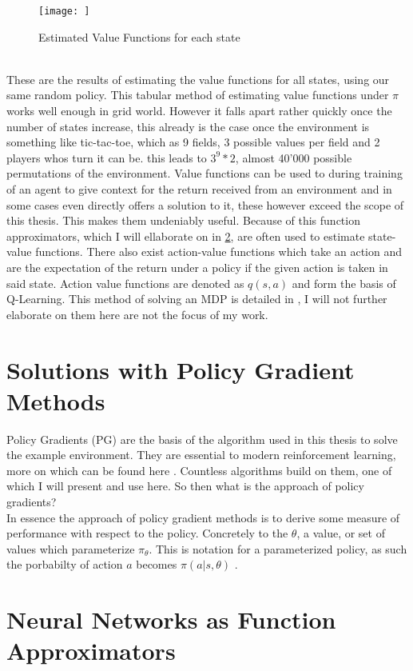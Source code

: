 \begin{figure}[h!]
    \centering
    \texttt{[image: ]}
    \caption{Estimated Value Functions for each state}
    \label{fig:value_functions_grid_world}
\end{figure}

\noindent
\\ These are the results of estimating the value functions for all states, using our same random policy. This tabular method of estimating value functions under $\pi$ works well enough in grid world. However it falls apart rather quickly once the number of states increase, this already is the case once the environment is something like tic-tac-toe, which as 9 fields, 3 possible values per field and 2 players whos turn it can be. this leads to $3^9 * 2$, almost 40'000 possible permutations of the environment. Value functions can be used to during training of an agent to give context for the return received from an environment and in some cases even directly offers a solution to it, these however exceed the scope of this thesis. This makes them undeniably useful. Because of this function approximators, which I will ellaborate on in \ref{sec:neural_networks}, are often used to estimate state-value functions. There also exist action-value functions which take an action and are the expectation of the return under a policy if the given action is taken in said state. Action value functions are denoted as $q(s, a)$ and form the basis of Q-Learning. This method of solving an MDP is detailed in , I will not further elaborate on them here are not the focus of my work.

\newpage
\section{Solutions with Policy Gradient Methods}\label{sec:policy_gradient}
\noindent
Policy Gradients (PG) are the basis of the algorithm used in this thesis to solve the example environment. They are essential to modern reinforcement learning, more on which can be found here \cite{grigsby_overview_2018}. Countless algorithms build on them, one of which I will present and use here. So then what is the approach of policy gradients? 
\\ In essence the approach of policy gradient methods is to derive some measure of performance with respect to the policy. Concretely to the $\theta$, a value, or set of values which parameterize $\pi_\theta$. This is notation for a parameterized policy, as such the porbabilty of action $a$ becomes $\pi(a|s, \theta)$ .

\newpage
\section{Neural Networks as Function Approximators}\label{sec:neural_networks}